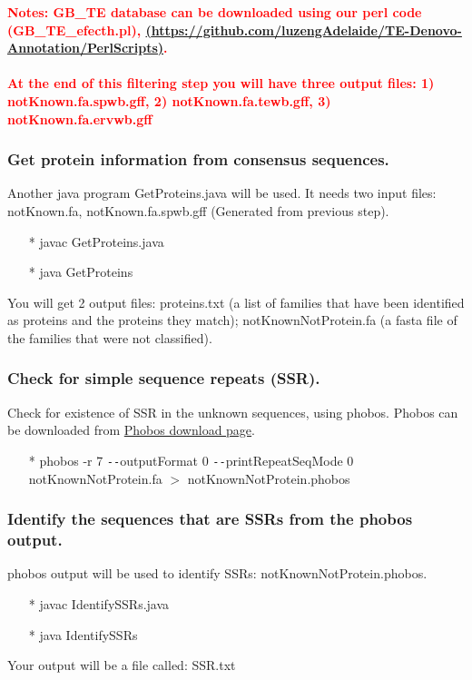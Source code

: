 \documentclass[12pt]{report}
\begin{document}
\noindent\textbf{\textcolor{red}{Notes: GB\_TE database can be downloaded using our perl code (GB\_TE\_efecth.pl), \href{<url>}(\url{https://github.com/luzengAdelaide/TE-Denovo-Annotation/PerlScripts)}. \\
		\\
At the end of this filtering step you will have three output files: 1) notKnown.fa.spwb.gff, 2) notKnown.fa.tewb.gff, 3) notKnown.fa.ervwb.gff}} 

\subsubsection*{Get protein information from consensus sequences.}
Another java program GetProteins.java will be used. It needs two input files: notKnown.fa, notKnown.fa.spwb.gff (Generated from previous step).
\begin{enumerate}
	\item[*] javac GetProteins.java
	\item[*] java GetProteins
\end{enumerate}
You will get 2 output files: proteins.txt (a list of families that have been identified as proteins and the proteins they match);
notKnownNotProtein.fa (a fasta file of the families that were not classified).

\subsubsection*{Check for simple sequence repeats (SSR).}
Check for existence of SSR in the unknown sequences, using phobos. Phobos can be downloaded from \href{http://www.ruhr-uni-bochum.de/ecoevo/cm/cm_phobos.htm} {\color{blue} Phobos download page}.
\begin{enumerate}
	\item[*] phobos -r 7 \texttt{-{}-}outputFormat 0 \texttt{-{}-}printRepeatSeqMode 0 notKnownNotProtein.fa $>$ notKnownNotProtein.phobos
\end{enumerate}

\subsubsection*{Identify the sequences that are SSRs from the phobos output.}
phobos output will be used to identify SSRs: notKnownNotProtein.phobos.
\begin{enumerate}
	\item[*] javac IdentifySSRs.java
	\item[*] java IdentifySSRs
\end{enumerate}
Your output will be a file called: SSR.txt
\end{document}
